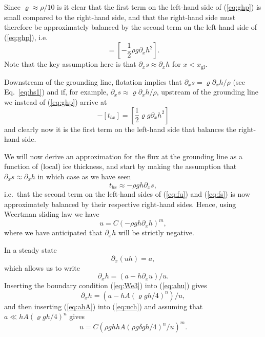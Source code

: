 \documentclass[10pt,a4paper]{book}
\newcommand{\p}{\partial}
\newcommand{\xgl}{x_{\mathrm{gl}}}
\begin{document}
Since $\varrho \approx \rho/10$ is it
clear that the first term on the left-hand side of (\ref{eq:ghp}) is
small compared to the right-hand side, and that the right-hand side
must therefore be approximately balanced by the second term on the
left-hand side of (\ref{eq:ghp}), i.e.
\begin{equation}
  [t_{bx}] = [-\frac{1}{2} \rho g \p_x h^2].
\label{eq:ghp2}
\end{equation}
Note that the key assumption here is that
$\p_x s \approx \p_x h$ for $x < \xgl$.

Downstream of the
grounding line, flotation implies that $\p_x s = \varrho \p_x h/\rho$
(see Eq.~\ref{eq:hs1}) and if, for example, $\p_x s \approx 
\varrho \p_x h / \rho$, upstream of the grounding line we instead of
(\ref{eq:ghp}) arrive at
\begin{equation}
[\frac{1}{2}\varrho g h^2] - [t_{bx}] = [\frac{1}{2} \varrho g  \p_x h^2]
\label{eq:ghp2b}
\end{equation}
and clearly now it is the first term on the left-hand side that balances the right-hand
side.



We will now derive an approximation for the flux at the grounding line
as a function of (local) ice thickness, and start by making the
assumption that $\p_x s \approx \p_x h$ in which case as we have seen
\[
t_{bx} \approx - \rho g h \p_x s ,
\]
i.e.\ that the second term on the left-hand sides of (\ref{eq:fu}) and
(\ref{eq:fs}) is now approximately balanced by their respective right-hand
sides.  Hence, using Weertman sliding law we have
\begin{equation}
   u = C (-\rho g h \p_x h )^m ,
\label{eq:uch}
\end{equation}
where we have anticipated that $\p_x h$ will be strictly negative. 


In a steady state
\begin{equation}
  \p_x (uh) = a , \label{eq:ass}
\end{equation}
which allows us to write
\begin{equation}
 \p_x h =(a- h \p_x u)/u .
\label{eq:ahu}
\end{equation}
Inserting the boundary condition (\ref{eq:We3}) into (\ref{eq:ahu}) gives
\begin{equation}
\p_x h =(a- h A (\varrho g h/4)^n )/u ,
\label{eq:ahA}
\end{equation}
and then inserting (\ref{eq:ahA}) into (\ref{eq:uch}) and assuming that $a \ll
h A (\varrho g h/4)^n $ gives
\begin{equation}
   u = C \left (\rho g h h A \left (\rho g \delta g h/4 \right )^n /u \right )^m .
\label{eq:uch2}
\end{equation}
\end{document}
